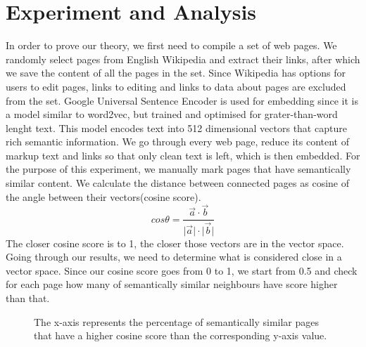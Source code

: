 \documentclass{article}
\newcommand{\norm}[1]{\lvert #1 \rvert}
\newcommand\boxplotbignum{1000000}
\begin{document}
\section{Experiment and Analysis}
In order to prove our theory, we first need to compile a set of web pages. We randomly select pages from English Wikipedia and extract their links, after which we save the content of all the pages in the set. Since Wikipedia has options for users to edit pages, links to editing and links to data about pages are excluded from the set. Google Universal Sentence Encoder \cite{USE} is used for embedding since it is a model similar to word2vec, but trained and optimised for grater-than-word lenght text. This model encodes text into 512 dimensional vectors that capture rich semantic information. We go through every web page, reduce its content of markup text and links so that only clean text is left, which is then embedded.\newline
For the purpose of this experiment, we manually mark pages that have semantically similar content. We calculate the distance between connected pages as cosine of the angle between their vectors(cosine score). \[cos\theta = \frac{\vec{a} \cdot \vec{b}}{\norm{\vec{a}}\cdot\norm{\vec{b}}} \]The closer cosine score is to 1, the closer those vectors are in the vector space.\newline
Going through our results, we need to determine what is considered close in a vector space. Since our cosine score goes from 0 to 1, we start from 0.5 and check for each page how many of semantically similar neighbours have score higher than that. 
\begin{figure}[H]
  \caption{The x-axis represents the percentage of semantically similar pages that have a higher cosine score than the corresponding y-axis value.}
\end{figure}
\end{document}
